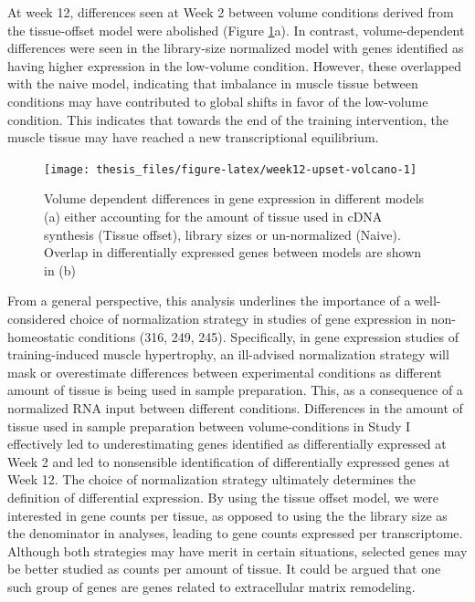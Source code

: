 \documentclass[twoside,10pt]{gihclass} %
\begin{document}
At week 12, differences seen at Week 2 between volume conditions derived from the tissue-offset model were abolished (Figure \ref{fig:week12-upset-volcano}a). In contrast, volume-dependent differences were seen in the library-size normalized model with genes identified as having higher expression in the low-volume condition. However, these overlapped with the naive model, indicating that imbalance in muscle tissue between conditions may have contributed to global shifts in favor of the low-volume condition. This indicates that towards the end of the training intervention, the muscle tissue may have reached a new transcriptional equilibrium.
\begin{figure}

{\centering \texttt{[image: thesis\_files/figure-latex/week12-upset-volcano-1]} 

}

\caption[General patterns of differentially expressed genes at Week 12]{Volume dependent differences in gene expression in different models (a) either accounting for the amount of tissue used in cDNA synthesis (Tissue offset), library sizes or un-normalized (Naive). Overlap in differentially expressed genes between models are shown in (b)}\label{fig:week12-upset-volcano}
\end{figure}
From a general perspective, this analysis underlines the importance of a well-considered choice of normalization strategy in studies of gene expression in non-homeostatic conditions
(316, 249, 245).
Specifically, in gene expression studies of training-induced muscle hypertrophy, an ill-advised normalization strategy will mask or overestimate differences between experimental conditions as different amount of tissue is being used in sample preparation. This, as a consequence of a normalized RNA input between different conditions. Differences in the amount of tissue used in sample preparation between volume-conditions in Study I effectively led to underestimating genes identified as differentially expressed at Week 2 and led to nonsensible identification of differentially expressed genes at Week 12.
The choice of normalization strategy ultimately determines the definition of differential expression. By using the tissue offset model, we were interested in gene counts per tissue, as opposed to using the the library size as the denominator in analyses, leading to gene counts expressed per transcriptome. Although both strategies may have merit in certain situations, selected genes may be better studied as counts per amount of tissue. It could be argued that one such group of genes are genes related to extracellular matrix remodeling.
\end{document}

